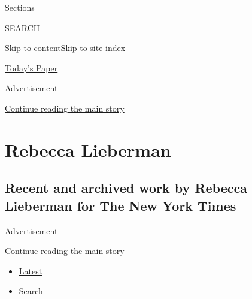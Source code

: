 Sections

SEARCH

\protect\hyperlink{site-content}{Skip to
content}\protect\hyperlink{site-index}{Skip to site index}

\href{https://myaccount.nytimes.com/auth/login?response_type=cookie\&client_id=vi}{}

\href{https://www.nytimes.com/section/todayspaper}{Today's Paper}

Advertisement

\protect\hyperlink{after-top}{Continue reading the main story}

\hypertarget{rebecca-lieberman}{%
\section{Rebecca Lieberman}\label{rebecca-lieberman}}

\hypertarget{recent-and-archived-work-by-rebecca-lieberman-for-the-new-york-times}{%
\subsection{Recent and archived work by Rebecca Lieberman for The New
York
Times}\label{recent-and-archived-work-by-rebecca-lieberman-for-the-new-york-times}}

Advertisement

\protect\hyperlink{after-mid1}{Continue reading the main story}

\begin{itemize}
\tightlist
\item
  \protect\hyperlink{stream-panel}{Latest}
\item
  Search
\end{itemize}

